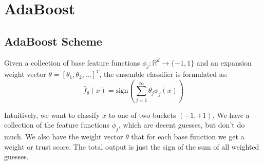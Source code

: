 \documentclass{article}
\begin{document}
\section{AdaBoost}
\subsection{AdaBoost Scheme}
Given a collection of base feature functions $\phi_j : \mathbb{R}^d \to \{-1,1\}$ and an expansion weight vector $\theta = [\theta_1, \theta_2, \dots]^T$, the ensemble classifier is formulated as:
\[ \hat{f}_\theta(x) = \text{sign}\left(\sum_{j=1}^{\infty} \theta_j \phi_j(x)\right) \]

Intuitively, we want to classify $x$ to one of two buckets $(-1,+1)$. We have a collection of the feature functions $\phi_j$, which are decent guesses, but don't do much. We also have the weight vector $\theta$ that for each base function we get a weight or trust score. The total output is just the sign of the sum of all weighted guesses.
\end{document}
